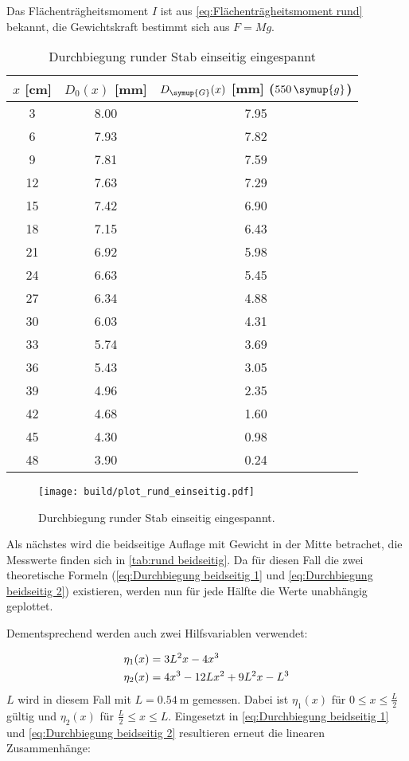 Das Flächenträgheitsmoment $I$ ist aus \autoref{eq:Flächenträgheitsmoment rund} bekannt, die Gewichtskraft
bestimmt sich aus $F=Mg$.

\begin{table} [H]
  \centering
  \caption{Durchbiegung runder Stab einseitig eingespannt}
  \label{tab:rund einseitig}
  \begin{tabular}{S[table-format=2.0] S[table-format=2.0] S[table-format=2.0]}
    \toprule
    {$x$ [cm]} & {$D_{0}(x)$ [mm]} & {$D_{\symup{G}}(x)$ [mm] ($550\,\symup{g}$)} \\
     & 8.00 & 7.95 \\
     6 & 7.93 & 7.82 \\
     9 & 7.81 & 7.59 \\
    12 & 7.63 & 7.29 \\
    15 & 7.42 & 6.90 \\ 
    18 & 7.15 & 6.43 \\
    21 & 6.92 & 5.98 \\
    24 & 6.63 & 5.45 \\
    27 & 6.34 & 4.88 \\
    30 & 6.03 & 4.31 \\
    33 & 5.74 & 3.69 \\
    36 & 5.43 & 3.05 \\
    39 & 4.96 & 2.35 \\
    42 & 4.68 & 1.60 \\
    45 & 4.30 & 0.98 \\
    48 & 3.90 & 0.24 \\ 
    \bottomrule
  \end{tabular}
\end{table}

\begin{figure} [H]
  \centering
  \texttt{[image: build/plot\_rund\_einseitig.pdf]}
  \caption{Durchbiegung runder Stab einseitig eingespannt.}
  \label{fig:rund_einseitig}
\end{figure}

Als nächstes wird die beidseitige Auflage mit Gewicht in der Mitte betrachet,
die Messwerte finden sich in \autoref{tab:rund beidseitig}.
Da für diesen Fall die zwei theoretische Formeln (\autoref{eq:Durchbiegung beidseitig 1} und \autoref{eq:Durchbiegung beidseitig 2}) existieren,
werden nun für jede Hälfte die Werte unabhängig geplottet.

Dementsprechend werden auch zwei Hilfsvariablen verwendet:

\begin{align}
  \eta_{1}(x)&=3L^{2}x-4x^{3}  \notag \\
  \eta_{2}(x)&=4x^{3}-12Lx^{2}+9L^{2}x-L^{3} \notag
\end{align}
$L$ wird in diesem Fall mit $L=\qty{0,54}{\metre}$ gemessen.
Dabei ist $\eta_{1}(x)$ für $0\leq x\leq \frac{L}{2}$ gültig und $\eta_{2}(x)$ für $\frac{L}{2}\leq x\leq L$.
Eingesetzt in \autoref{eq:Durchbiegung beidseitig 1} und \autoref{eq:Durchbiegung beidseitig 2}
resultieren erneut die linearen Zusammenhänge:

